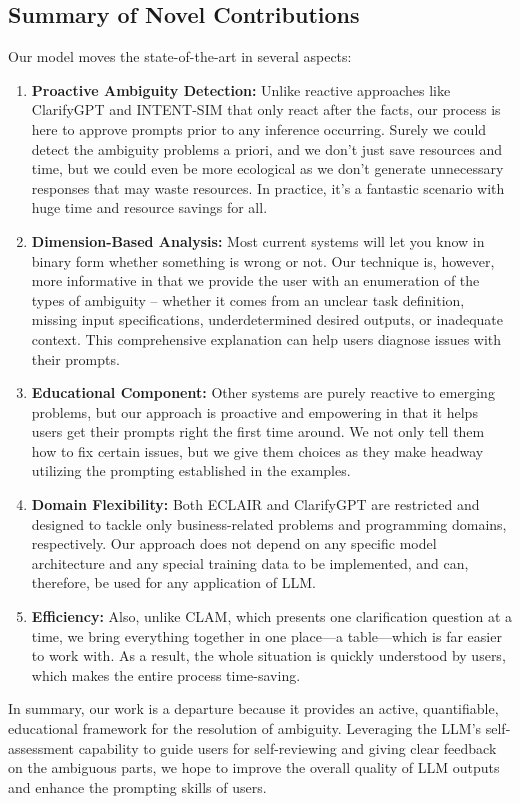 \documentclass[conference]{IEEEtran}
\begin{document}
\subsection{Summary of Novel Contributions}
Our model moves the state-of-the-art in several aspects:
\begin{enumerate}
    \item \textbf{Proactive Ambiguity Detection:} Unlike reactive approaches like ClarifyGPT and INTENT-SIM that only react after the facts, our process is here to approve prompts prior to any inference occurring. Surely we could detect the ambiguity problems a priori, and we don't just save resources and time, but we could even be more ecological as we don't generate unnecessary responses that may waste resources. In practice, it’s a fantastic scenario with huge time and resource savings for all.
    \item \textbf{Dimension-Based Analysis:} Most current systems will let you know in binary form whether something is wrong or not. Our technique is, however, more informative in that we provide the user with an enumeration of the types of ambiguity – whether it comes from an unclear task definition, missing input specifications, underdetermined desired outputs, or inadequate context. This comprehensive explanation can help users diagnose issues with their prompts.
    \item \textbf{Educational Component:} Other systems are purely reactive to emerging problems, but our approach is proactive and empowering in that it helps users get their prompts right the first time around. We not only tell them how to fix certain issues, but we give them choices as they make headway utilizing the prompting established in the examples.
    \item \textbf{Domain Flexibility:} Both ECLAIR and ClarifyGPT are restricted and designed to tackle only business-related problems and programming domains, respectively. Our approach does not depend on any specific model architecture and any special training data to be implemented, and can, therefore, be used for any application of LLM.
    \item \textbf{Efficiency:} Also, unlike CLAM, which presents one clarification question at a time, we bring everything together in one place—a table—which is far easier to work with. As a result, the whole situation is quickly understood by users, which makes the entire process time-saving.
\end{enumerate}
In summary, our work is a departure because it provides an active, quantifiable, educational framework for the resolution of ambiguity. Leveraging the LLM's self-assessment capability to guide users for self-reviewing and giving clear feedback on the ambiguous parts, we hope to improve the overall quality of LLM outputs and enhance the prompting skills of users.
\end{document}

